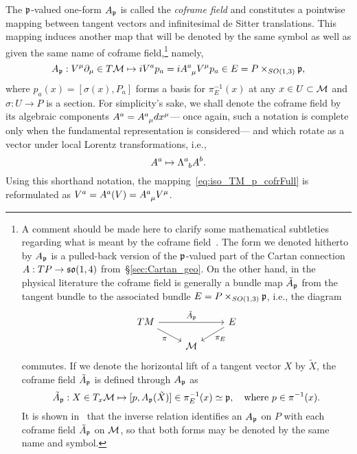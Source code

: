 \documentclass[
final,
11pt,
a4paper,
DIV=11,
headinclude=true,
footinclude=false,
bibliography=totoc,
twoside=true,  %
BCOR=5mm
]{scrbook}
\begin{document}
The $\mathfrak{p}$-valued one-form $A_\mathfrak{p}$ is called the 
\emph{coframe field} and constitutes a pointwise mapping between 
tangent vectors and infinitesimal de Sitter translations.  This 
mapping induces another map that will be denoted by the same 
symbol as well as given the same name of coframe 
field,\footnote{A comment should be made here to clarify some 
  mathematical subtleties regarding what is meant by the coframe 
  field~\cite{Wise:2010sm}. The form we denoted hitherto by 
  $A_\mathfrak{p}$ is a pulled-back version of the $\mathfrak{p}$-valued part 
  of the Cartan connection $A : TP \to \mathfrak{so}(1,4)$ 
  from~\S\ref{sec:Cartan_geo}. On the other hand, in the physical 
  literature the coframe field is generally a bundle map 
  $\tilde{A}_\mathfrak{p}$ from the tangent bundle to the associated 
  bundle $E = P \times_{SO(1,3)} \mathfrak{p}$, i.e., the diagram
  \begin{equation*}
    \begin{tikzcd}[
      row sep=11pt,
      ampersand replacement=\&,
      labels={font=\footnotesize}
      ]
      TM  \arrow[rr, "\tilde{A}_\mf{p}"]
          \arrow[dr, "\pi"'] \& \&
      E \arrow[dl, "\pi_E"]
      \\
      {} \& \mc{M} \&
    \end{tikzcd}
  \end{equation*}
  commutes. If we denote the horizontal lift of a tangent vector 
  $X$ by $\tilde{X}$, the coframe field $\tilde{A}_\mathfrak{p}$ is 
  defined through $A_\mathfrak{p}$ as
  \begin{equation*}
    \tilde{A}_\mathfrak{p} : X \in T_x\mathcal{M} \mapsto
    [p, A_\mathfrak{p}(\tilde{X})] \in \pi_E^{-1}(x) \simeq \mathfrak{p},
    \quad\text{where}~p \in \pi^{-1}(x).
  \end{equation*}
  It is shown in~\cite{Wise:2010sm} that the inverse relation 
  identifies an $A_\mathfrak{p}$ on $P$ with each coframe field 
  $\tilde{A}_\mathfrak{p}$ on $\mathcal{M}$, so that both forms may be 
  denoted by the same name and symbol.
  }
namely,
\begin{equation}
\label{eq:iso_TM_p_cofrFull}
  A_\mf{p} : V^\mu \pd_\mu \in T\mc{M}
  \mapsto
  i V^a p_a = i A\ind{^a_\mu}V^\mu p_a \in E = P \times_{SO(1,3)} 
  \mf{p},
\end{equation}
where $p_a(x) = [\sigma(x), P_a]$ forms a basis for 
$\pi_E^{-1}(x)$ at any $x \in U \subset \mathcal{M}$ and $\sigma 
: U \to P$ is a section. For simplicity's sake, we shall denote 
the coframe field by its algebraic components $A^a 
= A\ind{^a_\mu}dx^\mu$--- once again, such a notation is complete 
only when the fundamental representation is considered--- and 
which rotate as a vector under local Lorentz transformations, 
i.e.,
\begin{equation*}
  A^a \mapsto \Lambda\ind{^a_b} A^b.
\end{equation*}
Using this shorthand notation, the
mapping~\eqref{eq:iso_TM_p_cofrFull} is reformulated as $V^a 
= A^a(V) = A\ind{^a_\mu}V^\mu$.
\end{document}
